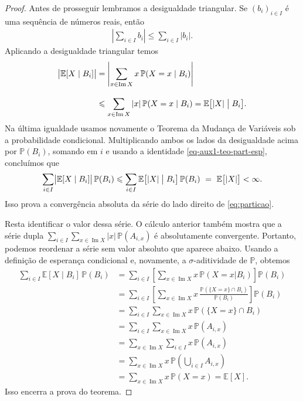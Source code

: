 \documentclass[12pt,portuguese]{article}
\theoremstyle{definition}
\begin{document}
\begin{proof}
Antes de prosseguir lembramos a desigualdade triangular. Se $(b_i)_{i\in I}$ é 
uma sequência de números reais, então
\begin{align*}
\left| \sum_{i\in I} b_i \right| \leqslant \sum_{i\in I} |b_i|.
\end{align*}
Aplicando a desigualdade triangular temos 
\begin{align*}
\bigl|\mathbb{E}[X\mid B_i]\bigr| 
&=
\left| \sum_{x\in\operatorname{Im}X} x\, \mathbb{P}(X=x\mid B_i) \right|
\\[0.3cm]
&\leqslant 
\sum_{x\in\operatorname{Im}X}|x|\,
\mathbb{P}(X=x\mid B_i)
=
\mathbb{E}\bigl[|X|\bigm|B_i\bigr].
\end{align*}
Na última igualdade usamos novamente o Teorema da Mudança de Variáveis
sob a probabilidade condicional. Multiplicando ambos os lados da 
desigualdade acima por \(\mathbb{P}(B_i)\),
somando em \(i\) e usando a identidade \eqref{eq-aux1-teo-part-esp}, 
concluímos que 
\begin{align*}
\sum_{i\in I}\bigl|\mathbb{E}[X\mid B_i]\bigr|\,\mathbb{P}(B_i)
\leqslant \sum_{i\in I}\mathbb{E}\bigl[|X|\bigm|B_i\bigr]\,\mathbb{P}(B_i)
\ = \ \mathbb{E}\bigl[|X|\bigr]<\infty.
\end{align*}
Isso prova a convergência absoluta da série do lado direito de
\eqref{eq:particao}.

\bigskip 

Resta identificar o valor dessa série. O cálculo anterior também mostra
que a série dupla
\(\sum_{i\in I}\sum_{x\in\operatorname{Im}X}|x|\,\mathbb{P}(A_{i,x})\)
é absolutamente convergente. Portanto, podemos reordenar a série sem valor absoluto
que aparece abaixo.
Usando a definição de esperança condicional e, novamente, a
\(\sigma\)-aditividade de \(\mathbb{P}\), obtemos
\begin{align*}
\sum_{i\in I}\mathbb{E}[X\mid B_i]\,\mathbb{P}(B_i)
&=
\sum_{i\in I} \left[ \sum_{x\in\operatorname{Im}X} x\,\mathbb{P}(X=x|B_i) \right] \mathbb{P}(B_i) 
\\[0.3cm]
&=
\sum_{i\in I} \left[ 
\sum_{x\in\operatorname{Im}X} x\, \frac{\mathbb{P}(\{X=x\}\cap B_i)}{\mathbb{P}(B_i)} 
\right] \mathbb{P}(B_i) 
\\[0.3cm]
&=
\sum_{i\in I} 
\sum_{x\in\operatorname{Im}X} x\, \mathbb{P}(\{X=x\}\cap B_i)
\\[0.3cm]
&=\sum_{i\in I}\sum_{x\in\operatorname{Im}X}x\,\mathbb{P}(A_{i,x}) 
\\[0.3cm]
&=\sum_{x\in\operatorname{Im}X}\sum_{i\in I}x\,\mathbb{P}(A_{i,x}) 
\\[0.3cm]
&=\sum_{x\in\operatorname{Im}X}x\,\mathbb{P}\left(\bigcup_{i\in I}A_{i,x}\right) 
\\[0.3cm]
&=\sum_{x\in\operatorname{Im}X}x\,\mathbb{P}(X=x)
=\mathbb{E}[X].
\end{align*}
Isso encerra a prova do teorema.
\end{proof}
\end{document}
